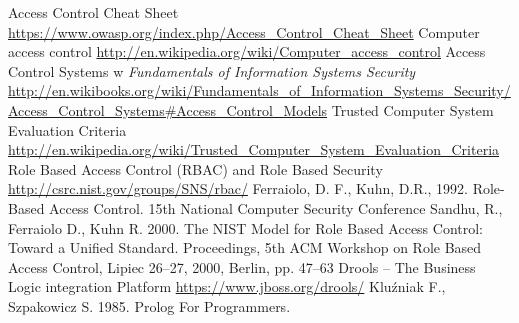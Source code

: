 \documentclass{classrep}
\begin{document}
\begin{thebibliography}{10}
Access Control Cheat Sheet \url{https://www.owasp.org/index.php/Access\_Control\_Cheat\_Sheet}
Computer access control \url{http://en.wikipedia.org/wiki/Computer\_access\_control}
Access Control Systems w \textsl{Fundamentals of Information Systems Security} \url{http://en.wikibooks.org/wiki/Fundamentals\_of\_Information\_Systems\_Security/Access\_Control\_Systems#Access\_Control\_Models}
Trusted Computer System Evaluation Criteria \url{http://en.wikipedia.org/wiki/Trusted\_Computer\_System\_Evaluation\_Criteria}
Role Based Access Control (RBAC) and Role Based Security \url{http://csrc.nist.gov/groups/SNS/rbac/}
Ferraiolo, D. F., Kuhn, D.R., 1992. Role-Based Access Control. 15th National Computer Security Conference
Sandhu, R., Ferraiolo D., Kuhn R. 2000. The NIST Model for  Role Based Access Control:  Toward a Unified Standard. 
Proceedings, 5th ACM Workshop on Role Based Access Control, Lipiec 26--27, 2000, Berlin, pp. 47--63 
Drools -- The Business Logic integration Platform \url{https://www.jboss.org/drools/}
Kluźniak F., Szpakowicz S. 1985. Prolog For Programmers.
\end{thebibliography}
\end{document}
